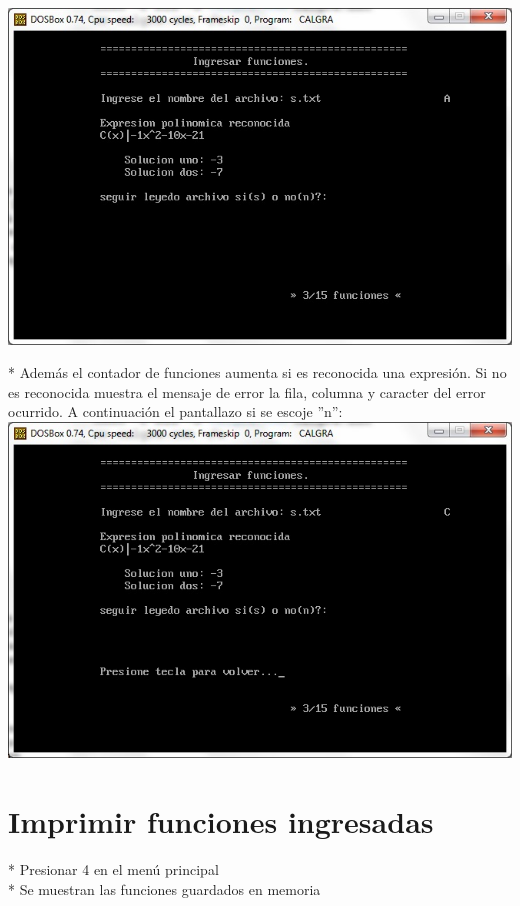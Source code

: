 \documentclass[journal]{../../IEEEtran/IEEEtran}
\begin{document}
\includegraphics[scale=0.42]{img/33.jpg}

* Además el contador de funciones aumenta si es reconocida una
expresión. Si no es reconocida muestra el mensaje de error la fila,
columna y caracter del error ocurrido. A continuación el pantallazo si
se escoje ''n'':\\

\includegraphics[scale=0.42]{img/34.jpg}



\section{Imprimir funciones ingresadas}

* Presionar 4 en el menú principal\\

* Se muestran las funciones guardados en memoria\\
\end{document}
